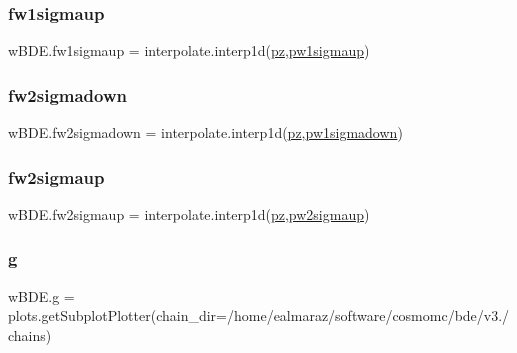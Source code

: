 \subsubsection{\texorpdfstring{fw1sigmaup}{fw1sigmaup}}
{\footnotesize\ttfamily w\+B\+D\+E.\+fw1sigmaup = interpolate.\+interp1d(\mbox{\hyperlink{namespacewBDE_a0718e21a1de05ef96e74436fa9610ddf}{pz}},\mbox{\hyperlink{namespacewBDE_a1ad3fbd7fad6fdbcfa61026acd763030}{pw1sigmaup}})}

\mbox{\label{namespacewBDE_aa3e56c7252d60d49b306a822120790cf}} 
\subsubsection{\texorpdfstring{fw2sigmadown}{fw2sigmadown}}
{\footnotesize\ttfamily w\+B\+D\+E.\+fw2sigmadown = interpolate.\+interp1d(\mbox{\hyperlink{namespacewBDE_a0718e21a1de05ef96e74436fa9610ddf}{pz}},\mbox{\hyperlink{namespacewBDE_adb9fc411d3d9a34889b4e17a31d5356c}{pw1sigmadown}})}

\mbox{\label{namespacewBDE_a293cc9d17f959a9ab5f50e8515276b98}} 
\subsubsection{\texorpdfstring{fw2sigmaup}{fw2sigmaup}}
{\footnotesize\ttfamily w\+B\+D\+E.\+fw2sigmaup = interpolate.\+interp1d(\mbox{\hyperlink{namespacewBDE_a0718e21a1de05ef96e74436fa9610ddf}{pz}},\mbox{\hyperlink{namespacewBDE_aef74e2ce221efa787815988ee03d82e8}{pw2sigmaup}})}

\mbox{\label{namespacewBDE_a0af99caaea92cb479d155f489102f46e}} 
\subsubsection{\texorpdfstring{g}{g}}
{\footnotesize\ttfamily w\+B\+D\+E.\+g = plots.\+get\+Subplot\+Plotter(chain\+\_\+dir=\textquotesingle{}/home/ealmaraz/software/cosmomc/bde/v3./chains\textquotesingle{})}

\mbox{\label{namespacewBDE_a94070e614d5d42c63b74274eb89af0c8}} 
